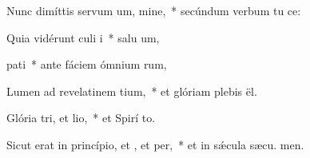 \item Nunc dimíttis servum um, mine,~* secúndum verbum tu  ce:
\item Quia vidérunt culi i~* salu um,
\item {} pati~* ante fáciem ómnium rum,
\item Lumen ad revelatinem tium,~* et glóriam plebis  ël.
\item Glória tri, et lio,~* et Spirí to.
\item Sicut erat in princípio, et , et per,~* et in sǽcula sæcu. men.
